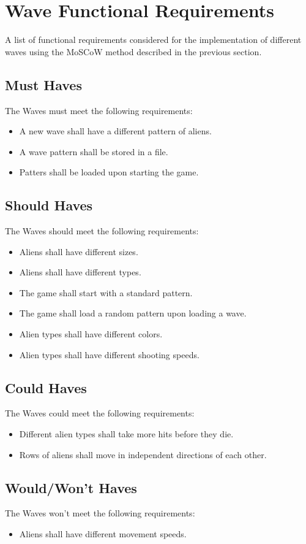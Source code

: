 \section{Wave Functional Requirements}

A list of functional requirements considered for the implementation of different waves using the MoSCoW method described in the previous section.

\subsection{Must Haves}
The Waves must meet the following requirements:
\begin{itemize}
	\item A new wave shall have a different pattern of aliens.
	\item A wave pattern shall be stored in a file.
	\item Patters shall be loaded upon starting the game.
\end{itemize}

\subsection{Should Haves}
The Waves should meet the following requirements:
\begin{itemize}
	\item Aliens shall have different sizes.
	\item Aliens shall have different types.
	\item The game shall start with a standard pattern. 
	\item The game shall load a random pattern upon loading a wave.
	\item Alien types shall have different colors.
	\item Alien types shall have different shooting speeds.
\end{itemize}

\subsection{Could Haves}
The Waves could meet the following requirements:
\begin{itemize}
	\item Different alien types shall take more hits before they die.
	\item Rows of aliens shall move in independent directions of each other.
\end{itemize}

\subsection{Would/Won't Haves}
The Waves won't meet the following requirements:
\begin{itemize}
	\item Aliens shall have different movement speeds.
\end{itemize}
